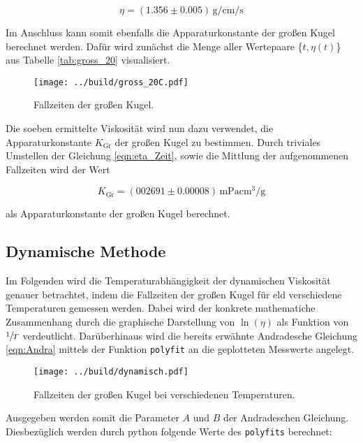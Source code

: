 \begin{equation}
\label{eqn:Viskositaet}
    \eta = (1.356 \pm 0.005)\,\unit{\gram\per\centi\meter\per\second}
\end{equation}

\noindent Im Anschluss kann somit ebenfalls die Apparaturkonstante der großen Kugel berechnet werden. Dafür wird zunächst die Menge 
aller Wertepaare \{$t,\eta(t)$\} aus Tabelle \ref{tab:gross_20} visualisiert.

\begin{figure}[H]
    \centering
    \texttt{[image: ../build/gross\_20C.pdf]}
    \caption{Fallzeiten der großen Kugel.}
\end{figure}

\noindent Die soeben ermittelte Viskosität wird nun dazu verwendet, die Apparaturkonstante $K_\text{Gr}$ der großen Kugel zu 
bestimmen. Durch triviales Umstellen der Gleichung \eqref{eqn:eta_Zeit}, sowie die Mittlung der aufgenommenen Fallzeiten wird 
der Wert 

\begin{equation*}
    K_\text{Gr} = \left(002691 \pm 0.00008\right)\,\unit{\milli\pascal\centi\cubic\meter\per\gram}
\end{equation*}

\noindent als Apparaturkonstante der großen Kugel berechnet.

\subsection{Dynamische Methode}

Im Folgenden wird die Temperaturabhängigkeit der dynamischen Viskosität genauer betrachtet, indem die Fallzeiten 
der großen Kugel für eld verschiedene Temperaturen gemessen werden. Dabei wird der konkrete mathematiche Zusammenhang 
durch die graphische Darstellung von $\ln(\eta)$ als Funktion von $\sfrac{1}{T}$ verdeutlicht. Darüberhinaus wird die 
bereits erwähnte Andradesche Gleichung \eqref{eqn:Andra} mittels der Funktion \texttt{polyfit} an die geplotteten Messwerte 
angelegt.

\begin{figure}[H]
    \centering
    \texttt{[image: ../build/dynamisch.pdf]}
    \caption{Fallzeiten der großen Kugel bei verschiedenen Temperaturen.}
\end{figure}

\noindent Ausgegeben werden somit die Parameter $A$ und $B$ der Andradeschen Gleichung. Diesbezüglich werden durch 
python folgende Werte des \texttt{polyfits} berechnet:

